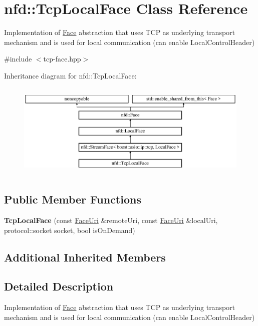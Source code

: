 \hypertarget{classnfd_1_1TcpLocalFace}{}\section{nfd\+:\+:Tcp\+Local\+Face Class Reference}
\label{classnfd_1_1TcpLocalFace}


Implementation of \hyperlink{classnfd_1_1Face}{Face} abstraction that uses T\+CP as underlying transport mechanism and is used for local communication (can enable Local\+Control\+Header)  




{\ttfamily \#include $<$tcp-\/face.\+hpp$>$}

Inheritance diagram for nfd\+:\+:Tcp\+Local\+Face\+:\begin{figure}[H]
\begin{center}
\leavevmode
\includegraphics[height=4.620462cm]{classnfd_1_1TcpLocalFace}
\end{center}
\end{figure}
\subsection*{Public Member Functions}
\begin{DoxyCompactItemize}
\item 
{\bfseries Tcp\+Local\+Face} (const \hyperlink{classndn_1_1util_1_1FaceUri}{Face\+Uri} \&remote\+Uri, const \hyperlink{classndn_1_1util_1_1FaceUri}{Face\+Uri} \&local\+Uri, protocol\+::socket socket, bool is\+On\+Demand)\hypertarget{classnfd_1_1TcpLocalFace_a2596ecaa11423f4bffaed1ef424a48cd}{}\label{classnfd_1_1TcpLocalFace_a2596ecaa11423f4bffaed1ef424a48cd}

\end{DoxyCompactItemize}
\subsection*{Additional Inherited Members}


\subsection{Detailed Description}
Implementation of \hyperlink{classnfd_1_1Face}{Face} abstraction that uses T\+CP as underlying transport mechanism and is used for local communication (can enable Local\+Control\+Header) 

